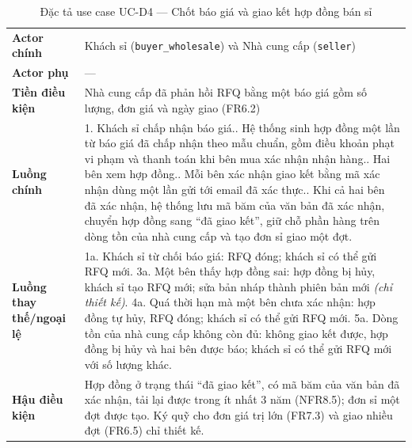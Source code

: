 \begingroup
\tblsetup
\begin{longtable}{L{3.00cm} L{12.25cm}}
\caption{Đặc tả use case UC-D4 --- Chốt báo giá và giao kết hợp đồng bán sỉ}
\label{tab:uc-d4} \\
\toprule
{}
 \\
\midrule
\endfirsthead
\bottomrule
\endfoot
\textbf{Actor chính} & Khách sỉ (\texttt{buyer\_wholesale}) và Nhà cung cấp (\texttt{seller}) \\
\textbf{Actor phụ} & --- \\
\textbf{Tiền điều kiện} & Nhà cung cấp đã phản hồi RFQ bằng một báo giá gồm số lượng, đơn giá và ngày giao (FR6.2) \\
\textbf{Luồng chính} &
1. Khách sỉ chấp nhận báo giá.. Hệ thống sinh hợp đồng một lần từ báo giá đã chấp nhận theo mẫu chuẩn, gồm điều khoản phạt vi phạm và thanh toán khi bên mua xác nhận nhận hàng.. Hai bên xem hợp đồng.. Mỗi bên xác nhận giao kết bằng mã xác nhận dùng một lần gửi tới email đã xác thực.. Khi cả hai bên đã xác nhận, hệ thống lưu mã băm của văn bản đã xác nhận, chuyển hợp đồng sang ``đã giao kết'', giữ chỗ phần hàng trên dòng tồn của nhà cung cấp và tạo đơn sỉ giao một đợt. \\
\textbf{Luồng thay thế/ngoại lệ} &
1a. Khách sỉ từ chối báo giá: RFQ đóng; khách sỉ có thể gửi RFQ mới.\newline
3a. Một bên thấy hợp đồng sai: hợp đồng bị hủy, khách sỉ tạo RFQ mới; sửa bản nháp thành phiên bản mới \emph{(chỉ thiết kế)}.\newline
4a. Quá thời hạn mà một bên chưa xác nhận: hợp đồng tự hủy, RFQ đóng; khách sỉ có thể gửi RFQ mới.\newline
5a. Dòng tồn của nhà cung cấp không còn đủ: không giao kết được, hợp đồng bị hủy và hai bên được báo; khách sỉ có thể gửi RFQ mới với số lượng khác. \\
\textbf{Hậu điều kiện} & Hợp đồng ở trạng thái ``đã giao kết'', có mã băm của văn bản đã xác nhận, tải lại được trong ít nhất 3 năm (NFR8.5); đơn sỉ một đợt được tạo. Ký quỹ cho đơn giá trị lớn (FR7.3) và giao nhiều đợt (FR6.5) chỉ thiết kế. \\
\end{longtable}
\endgroup

